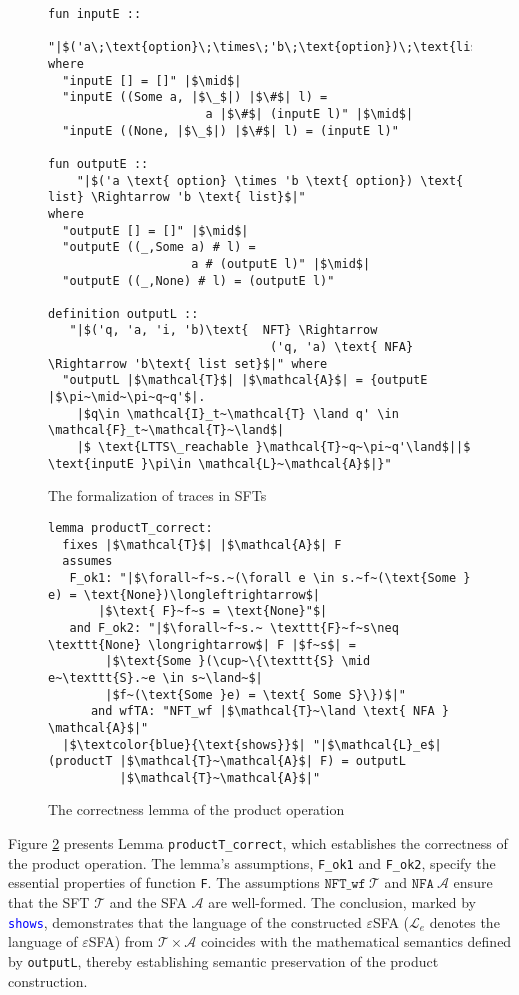 \documentclass[sigplan,10pt,anonymous,review]{acmart}\settopmatter{printfolios=true,printccs=false,printacmref=false}
\begin{document}
\begin{figure}[hbt!]
	\begin{lstlisting}
fun inputE :: 
   "|$('a\;\text{option}\;\times\;'b\;\text{option})\;\text{list}\;\Rightarrow\;'a\;\text{list}$|"
where
  "inputE [] = []" |$\mid$|
  "inputE ((Some a, |$\_$|) |$\#$| l) = 
                      a |$\#$| (inputE l)" |$\mid$|
  "inputE ((None, |$\_$|) |$\#$| l) = (inputE l)"

fun outputE :: 
    "|$('a \text{ option} \times 'b \text{ option}) \text{ list} \Rightarrow 'b \text{ list}$|" 
where
  "outputE [] = []" |$\mid$|
  "outputE ((_,Some a) # l) = 
                    a # (outputE l)" |$\mid$|
  "outputE ((_,None) # l) = (outputE l)"

definition outputL :: 
   "|$('q, 'a, 'i, 'b)\text{  NFT} \Rightarrow 
                               ('q, 'a) \text{ NFA} \Rightarrow 'b\text{ list set}$|" where
  "outputL |$\mathcal{T}$| |$\mathcal{A}$| = {outputE |$\pi~\mid~\pi~q~q'$|. 
    |$q\in \mathcal{I}_t~\mathcal{T} \land q' \in \mathcal{F}_t~\mathcal{T}~\land$| 
    |$ \text{LTTS\_reachable }\mathcal{T}~q~\pi~q'\land$||$ \text{inputE }\pi\in \mathcal{L}~\mathcal{A}$|}"
	\end{lstlisting}
\caption{The formalization of traces in SFTs}
\label{fig-def-output}
\end{figure}


\begin{figure}[hbt!]
	\begin{lstlisting}
lemma productT_correct:
  fixes |$\mathcal{T}$| |$\mathcal{A}$| F
  assumes 
   F_ok1: "|$\forall~f~s.~(\forall e \in s.~f~(\text{Some } e) = \text{None})\longleftrightarrow$|
       |$\text{ F}~f~s = \text{None}"$|
   and F_ok2: "|$\forall~f~s.~ \texttt{F}~f~s\neq \texttt{None} \longrightarrow$| F |$f~s$| = 
        |$\text{Some }(\cup~\{\texttt{S} \mid e~\texttt{S}.~e \in s~\land~$|
        |$f~(\text{Some }e) = \text{ Some S}\})$|"
      and wfTA: "NFT_wf |$\mathcal{T}~\land \text{ NFA } \mathcal{A}$|"
  |$\textcolor{blue}{\text{shows}}$| "|$\mathcal{L}_e$| (productT |$\mathcal{T}~\mathcal{A}$| F) = outputL 
          |$\mathcal{T}~\mathcal{A}$|"

	\end{lstlisting}
\caption{The correctness lemma of the product operation}
\label{fig-def-product-correct}
\end{figure}

Figure \ref{fig-def-product-correct} presents Lemma \texttt{productT\_correct}, which establishes the correctness of the product operation. The lemma's assumptions, \texttt{F\_ok1} and \texttt{F\_ok2}, specify the essential properties of function \texttt{F}. 
The assumptions $\texttt{NFT\_wf}~\mathcal{T}$ and $\texttt{NFA}~\mathcal{A}$ ensure that the SFT $\mathcal{T}$ and the SFA $\mathcal{A}$ are well-formed.
The conclusion, marked by \textcolor{blue}{\texttt{shows}}, demonstrates that the language of the constructed $\varepsilon$SFA ($\mathcal{L}_e$ denotes the language of $\varepsilon$SFA) from $\mathcal{T} \times \mathcal{A}$ coincides with the mathematical semantics defined by \texttt{outputL}, thereby establishing semantic preservation of the product construction.
\end{document}
